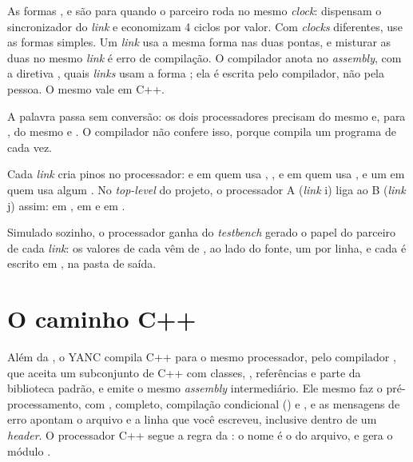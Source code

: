 As formas ,  e  são para quando o parceiro roda no mesmo \textit{clock}: dispensam o sincronizador do \textit{link} e economizam 4 ciclos por valor. Com \textit{clocks} diferentes, use as formas simples. Um \textit{link} usa a mesma forma nas duas pontas, e misturar as duas no mesmo \textit{link} é erro de compilação. O compilador anota no \textit{assembly}, com a diretiva , quais \textit{links} usam a forma ; ela é escrita pelo compilador, não pela pessoa. O mesmo vale em C++.

A palavra passa sem conversão: os dois processadores precisam do mesmo  e, para , do mesmo  e . O compilador não confere isso, porque compila um programa de cada vez.

Cada \textit{link} cria pinos no processador:  e  em quem usa , ,  e  em quem usa , e um  em quem usa algum . No \textit{top-level} do projeto, o processador A (\textit{link} i) liga ao B (\textit{link} j) assim:  em ,  em  e  em .

Simulado sozinho, o processador ganha do \textit{testbench} gerado o papel do parceiro de cada \textit{link}: os valores de cada  vêm de , ao lado do fonte, um por linha, e cada  é escrito em , na pasta de saída.

\section{O caminho C++}
\label{sec:caminho-cpp}

Além da \cmm{}, o YANC compila C++ para o mesmo processador, pelo compilador , que aceita um subconjunto de C++ com classes, , referências e parte da biblioteca padrão, e emite o mesmo \textit{assembly} intermediário. Ele mesmo faz o pré-processamento, com ,  completo, compilação condicional () e , e as mensagens de erro apontam o arquivo e a linha que você escreveu, inclusive dentro de um \textit{header}. O processador C++ segue a regra da \cmm{}: o nome é o do arquivo, e  gera o módulo .

